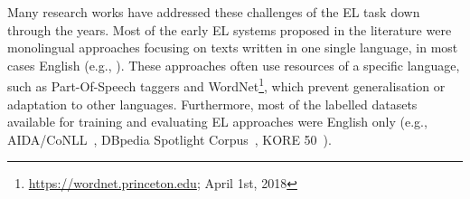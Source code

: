 \documentclass{llncs}
\begin{document}

 
Many research works have addressed these challenges of the EL task down through the years. Most of the early EL systems proposed in the literature were monolingual approaches focusing on texts written in one single language, in most cases English (e.g., \cite{mendes2011dbpedia,aida2011}). These approaches often use resources of a specific language, such as Part-Of-Speech taggers and WordNet\footnote{\url{https://wordnet.princeton.edu}; April 1st, 2018}, which prevent generalisation or adaptation to other languages. Furthermore, most of the labelled datasets available for training and evaluating EL approaches were English only (e.g., AIDA/CoNLL~\cite{aida2011}, DBpedia Spotlight Corpus~\cite{mendes2011dbpedia}, KORE 50~\cite{kore50}). 
\end{document}
